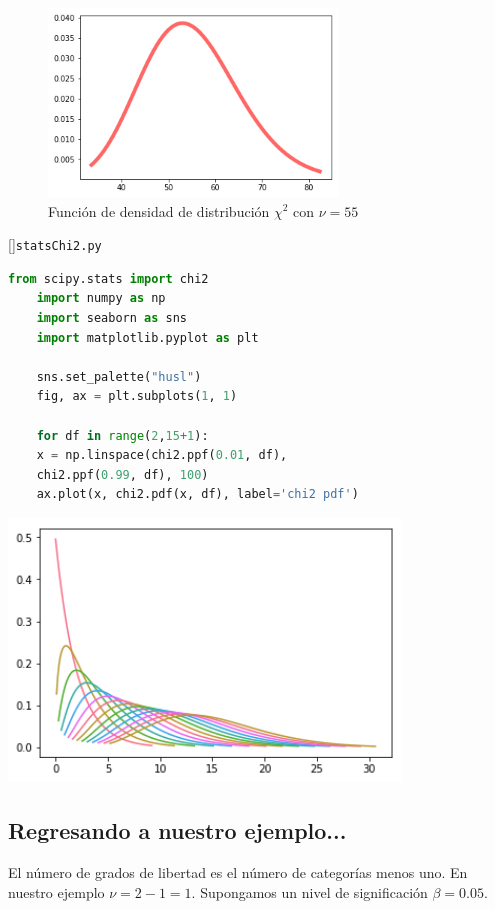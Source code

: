 \begin{figure}
	\centering
	\includegraphics[height=5cm,keepaspectratio=true]{./images/statsChi2.png}
	\caption{Función de densidad de distribución $\chi^2$ con $\nu=55$}
	\label{fig:Chi2}
\end{figure}


[]{\texttt{statsChi2.py}}
\begin{lstlisting}[language=Python]
	from scipy.stats import chi2
	import numpy as np
	import seaborn as sns
	import matplotlib.pyplot as plt
	
	sns.set_palette("husl")
	fig, ax = plt.subplots(1, 1)
	
	for df in range(2,15+1):
	x = np.linspace(chi2.ppf(0.01, df),
	chi2.ppf(0.99, df), 100)
	ax.plot(x, chi2.pdf(x, df), label='chi2 pdf')
\end{lstlisting}



\begin{center}
	\includegraphics[height=7cm,keepaspectratio=true]{./images/statsChi2Several.png}
\end{center}


\subsection{Regresando a nuestro ejemplo...}
El número de grados de libertad es el número de categorías menos uno.  En nuestro ejemplo $\nu = 2-1 =1.$  Supongamos un nivel de significación $\beta=0.05.$


